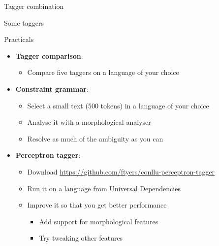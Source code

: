 \documentclass{beamer}
\begin{document}

\begin{frame}{Tagger combination}



\end{frame}


\begin{frame}{Some taggers}




\end{frame}


 

\begin{frame}{Practicals}

\begin{itemize}
  \item \textbf{Tagger comparison}:
  \begin{itemize}
     \item Compare five taggers on a language of your choice
  \end{itemize}
  \item \textbf{Constraint grammar}: 
  \begin{itemize}
     \item Select a small text (500 tokens) in a language of your choice
     \item Analyse it with a morphological analyser
     \item Resolve as much of the ambiguity as you can
  \end{itemize}
  \item \textbf{Perceptron tagger}:
  \begin{itemize}
     \item Download \url{https://github.com/ftyers/conllu-perceptron-tagger}
     \item Run it on a language from Universal Dependencies
     \item Improve it so that you get better performance
     \begin{itemize}
       \item Add support for morphological features
       \item Try tweaking other features
     \end{itemize}
  \end{itemize}
\end{itemize}

\end{frame}
\end{document}
